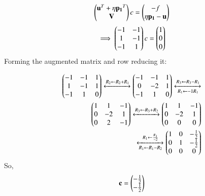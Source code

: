 \documentclass[journal,12pt,twocolumn]{IEEEtran}
\begin{document}
\begin{align}
\begin{pmatrix}\mathbf{u}^T + \eta\mathbf{p_1}^T \\ \mathbf{V}\end{pmatrix}c = \begin{pmatrix}-f \\ \eta\mathbf{p_1} - \mathbf{u}\end{pmatrix} 
\end{align}
\begin{align}
\implies \begin{pmatrix} -1 & -1   \\ 1 & -1 \\ -1 & 1 \end{pmatrix}c = \begin{pmatrix}1 \\ 0 \\ 0\end{pmatrix}
\end{align}
Forming the augmented matrix and row reducing
it:



\begin{align}
\myvec{-1  &  -1 &  1 \\   1 & -1 &  1 \\  -1 & 1 & 0}  \label{2.30}
\xleftrightarrow[]{R_2 \leftarrow R_2+R_1  }
%
\myvec{
-1 & -1 & 1 \\ 0 & -2 & 1 \\ -1 & 1 & 0  
} 
\xleftrightarrow[R_1 \leftarrow -1R_1] {R_3 \leftarrow  R_3 - R_1}  \nonumber  \\
%
\myvec{
1 & 1 & -1 \\ 0 & -2 & 1 \\ 0 & 2 & -1 
}
\xleftrightarrow[]{R_3 \leftarrow R_3 +R_2 } 
%	
\myvec{
1 & 1 & -1 \\ 0 & -2 & 1 \\ 0 & 0 & 0 
} \nonumber   \\
\xleftrightarrow[R_1 \leftarrow R_1 -R_2]{R_1 \leftarrow \frac{R_1}{-2}} 
\myvec{
1 & 0 & -\frac{1}{2} \\ 0 & 1 & - \frac{1}{2} \\ 0 & 0 & 0
}
\end{align}
So,
\begin{align}
\mathbf{c} = \begin{pmatrix} -\frac{1}{2} \\ -\frac{1}{2}  \end{pmatrix} \label{2.31}
\end{align}
\end{document}
